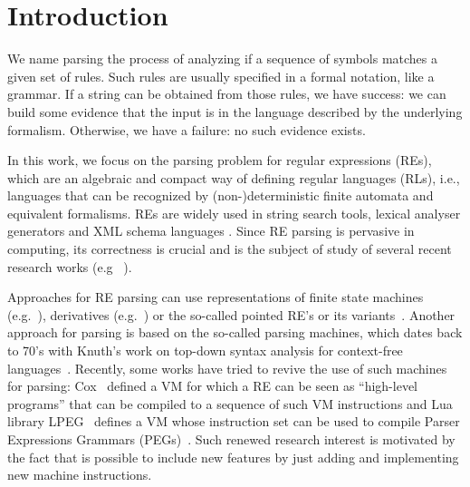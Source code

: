 \documentclass[sigplan]{acmart}
\theoremstyle{definition}
\begin{document}
\maketitle


\section{Introduction}

We name parsing the process of analyzing if a sequence of symbols matches a given set of rules.
Such rules are usually specified in a formal notation, like a grammar. If a string can be obtained
from those rules, we have success: we can build some evidence that the input is in the language
described by the underlying formalism. Otherwise, we have a failure: no such evidence exists.

In this work, we focus on the parsing problem for regular expressions (REs), which are an algebraic
and compact way of defining regular languages (RLs), i.e., languages that can be recognized by
(non-)deterministic finite automata and equivalent formalisms. REs are widely used in string search
tools, lexical analyser generators and XML schema languages \cite{Frisch2004}. Since RE parsing
is pervasive in computing, its correctness is crucial and is the subject of study of several
recent research works (e.g ~\cite{Firsov13,Ribeiro2017,Lopes2016,Asperti10}).

Approaches for RE parsing can use representations of finite state machines (e.g.~\cite{Firsov13}),
derivatives (e.g.~\cite{Ribeiro2017,Lopes2016}) or the so-called pointed RE's or its
variants~\cite{Asperti10,Fischer2010}. Another approach for parsing is based on the so-called
parsing machines, which dates back to 70's with Knuth's work
on top-down syntax analysis for context-free languages~\cite{Knuth71}. Recently, some works
have tried to revive the use of such machines for parsing: Cox~\cite{Cox2009} defined a VM
for which a RE can be seen as ``high-level programs'' that can be compiled to a sequence of
such VM instructions and Lua library LPEG~\cite{Ierusalimschy2009} defines a VM whose instruction
set can be used to compile Parser Expressions Grammars (PEGs)~\cite{Ford04}. Such renewed research
interest is motivated by the fact that is possible to include new features by just adding and
implementing new machine instructions.
\end{document}
